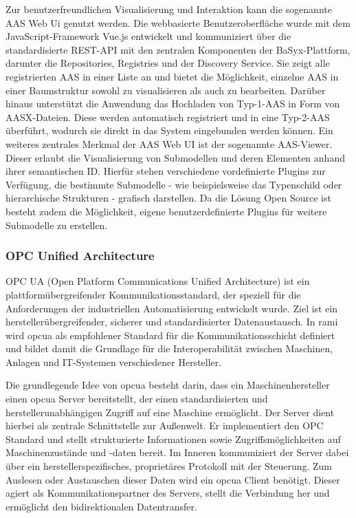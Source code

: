 Zur benutzerfreundlichen Visualisierung und Interaktion kann die sogenannte AAS Web Ui genutzt werden.
Die webbasierte Benutzeroberfläche wurde mit dem JavaScript-Framework Vue.js entwickelt und kommuniziert über die standardisierte REST-API mit den zentralen Komponenten der BaSyx-Plattform, darunter die Repositories, Registries und der Discovery Service.
Sie zeigt alle registrierten AAS in einer Liste an und bietet die Möglichkeit, einzelne AAS in einer Baumstruktur sowohl zu visualisieren als auch zu bearbeiten. 
Darüber hinaus unterstützt die Anwendung das Hochladen von Typ-1-AAS in Form von AASX-Dateien. Diese werden automatisch registriert und in eine Typ-2-AAS überführt, wodurch sie direkt in das System eingebunden werden können.
Ein weiteres zentrales Merkmal der AAS Web UI ist der sogenannte AAS-Viewer.
Dieser erlaubt die Visualisierung von Submodellen und deren Elementen anhand ihrer semantischen ID. 
Hierfür stehen verschiedene vordefinierte Plugins zur Verfügung, die bestimmte Submodelle - wie beispielsweise das Typenschild oder hierarchische Strukturen - grafisch darstellen.
Da die Lösung Open Source ist besteht zudem die Möglichkeit, eigene benutzerdefinierte Plugins für weitere Submodelle zu erstellen. \cite{BaSyxWiki} \cite{BaSyxEclipse}

\subsubsection{OPC Unified Architecture}
OPC UA (Open Platform Communications Unified Architecture) ist ein plattformübergreifender Kommunikationsstandard, der speziell für die Anforderungen der industriellen Automatisierung entwickelt wurde.
Ziel ist ein herstellerübergreifender, sicherer und standardisierter Datenaustausch.
In \acs{rami} \cite{RAMI4.0} wird \acs{opcua} als empfohlener Standard für die Kommunikationsschicht definiert und bildet damit die Grundlage für die Interoperabilität zwischen Maschinen, Anlagen und IT-Systemen verschiedener Hersteller.

Die grundlegende Idee von \acs{opcua} besteht darin, dass ein Maschinenhersteller einen \acs{opcua} Server bereitstellt, der einen standardisierten und herstellerunabhängigen Zugriff auf eine Maschine ermöglicht.
Der Server dient hierbei als zentrale Schnittstelle zur Außenwelt. Er implementiert den OPC Standard und stellt strukturierte Informationen sowie Zugriffsmöglichkeiten auf Maschinenzustände und -daten bereit.
Im Inneren kommuniziert der Server dabei über ein herstellerspezifisches, proprietäres Protokoll mit der Steuerung.
Zum Auslesen oder Austauschen dieser Daten wird ein \acs{opcua} Client benötigt. Dieser agiert als Kommunikationspartner des Servers, stellt die Verbindung her und ermöglicht den bidirektionalen Datentransfer. \cite{OPCUA}